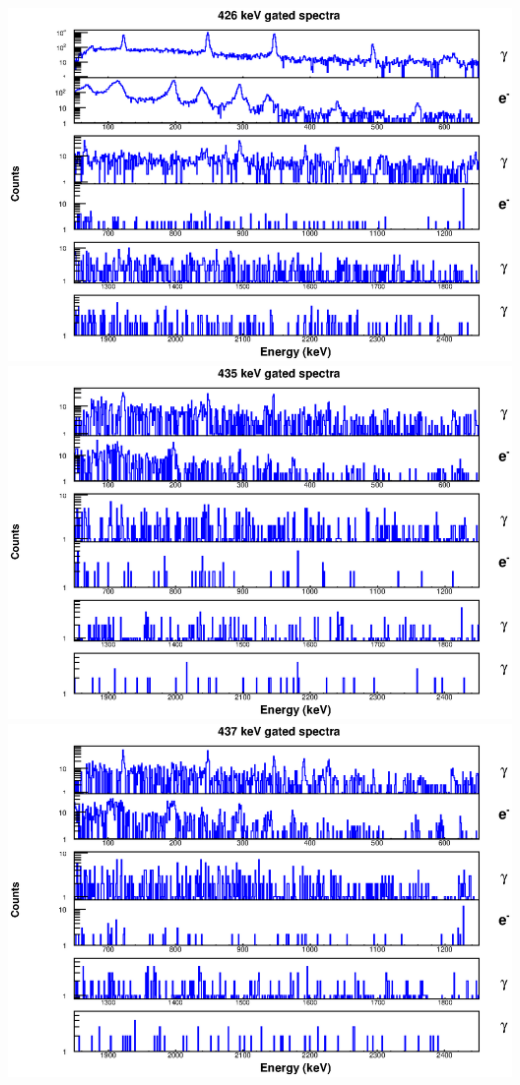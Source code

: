 \includegraphics[scale=0.8]{154Gd_Appendix/426_combined.eps}
\includegraphics[scale=0.8]{154Gd_Appendix/435_combined.eps}
\includegraphics[scale=0.8]{154Gd_Appendix/437_combined.eps}
